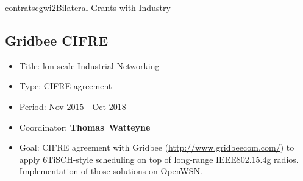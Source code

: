 \documentclass{ra2016}
\newcommand{\thomas}           {\textbf{Thomas~Watteyne}}
\begin{document}
\begin{module}{contrats}{cgwi2}{Bilateral Grants with Industry}

\subsection{Gridbee CIFRE}

\begin{participants}
\end{participants}

\begin{itemize}
    \item Title: km-scale Industrial Networking
    \item Type: CIFRE agreement
    \item Period: Nov 2015 - Oct 2018
    \item Coordinator: \thomas
    \item Goal: CIFRE agreement with Gridbee (\url{http://www.gridbeecom.com/}) to apply 6TiSCH-style scheduling on top of long-range IEEE802.15.4g radios. Implementation of those solutions on OpenWSN.
\end{itemize}

\end{module}

\end{document}

